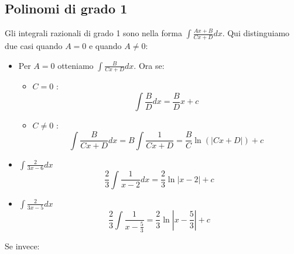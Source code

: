 \subsection*{Polinomi di grado 1}
Gli integrali razionali di grado 1 sono nella forma $\int\frac{Ax+B}{Cx+D}dx$. Qui distinguiamo due casi quando $A=0$ e quando $A\neq0$:
\begin{itemize}
    \item Per $A=0$ otteniamo $\int\frac{B}{Cx+D}dx$. Ora se:
    \begin{itemize}
        \item $C=0$ : \begin{equation*}\int\frac{B}{D}dx=\frac{B}{D}x+c\end{equation*}
        \item $C\neq0$ : \begin{equation*}\int\frac{B}{Cx+D}dx=B\int\frac{1}{Cx+D}=\frac{B}{C}\ln(|Cx+D|)+c\end{equation*}
    \end{itemize}
\end{itemize}    
    \begin{example}\phantom{}
    \begin{itemize}
        \item $\int\frac{2}{3x-6}dx$\begin{equation*}\frac{2}{3}\int\frac{1}{x-2}dx=\frac{2}{3}\ln|x-2|+c\end{equation*}
        \item $\int\frac{2}{3x-5}dx$\begin{equation*}\frac{2}{3}\int\frac{1}{x-\frac{5}{3}}=\frac{2}{3}\ln|x-\frac{5}{3}|+c\end{equation*}
    \end{itemize}
    \end{example}
Se invece:
